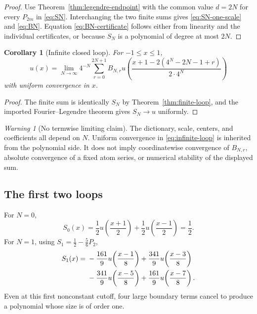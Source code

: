 \documentclass[11pt,oneside]{article}
\newtheorem{corollary}[theorem]{Corollary}
\theoremstyle{definition}
\theoremstyle{remark}
\newtheorem{warning}[theorem]{Warning}
\begin{document}
\begin{proof}
Use Theorem~\ref{thm:legendre-endpoint} with the common value $d=2N$ for
every $P_{2m}$ in \eqref{eq:SN}.  Interchanging the two finite sums gives
\eqref{eq:SN-one-scale} and \eqref{eq:BN}.  Equation
\eqref{eq:BN-certificate} follows either from linearity and the individual
certificates, or because $S_N$ is a polynomial of degree at most $2N$.
\end{proof}

\begin{corollary}[Infinite closed loop]
\label{cor:infinite-loop}
For $-1\le x\le1$,
\begin{equation}
 \boxed{
 u(x)=\lim_{N\to\infty}4^{-N}\sum_{r=0}^{2N+1}B_{N,r}
 u\!\left(
 \frac{x+1-2(4^N-2N-1+r)}{2\cdot4^N}
 \right)}
 \label{eq:infinite-loop}
\end{equation}
with uniform convergence in $x$.
\end{corollary}

\begin{proof}
The finite sum is identically $S_N$ by Theorem~\ref{thm:finite-loop}, and the
imported Fourier--Legendre theorem gives $S_N\to u$ uniformly.
\end{proof}

\begin{warning}[No termwise limiting claim]
The dictionary, scale, centers, and coefficients all depend on $N$.  Uniform
convergence in \eqref{eq:infinite-loop} is inherited from the polynomial side.
It does not imply coordinatewise convergence of $B_{N,r}$, absolute
convergence of a fixed atom series, or numerical stability of the displayed
sum.
\end{warning}

\subsection{The first two loops}
For $N=0$,
\begin{equation}
 S_0(x)=\frac12u\!\left(\frac{x+1}{2}\right)
       +\frac12u\!\left(\frac{x-1}{2}\right)=\frac12.
 \label{eq:S0-loop}
\end{equation}
For $N=1$, using $S_1=\frac12-\frac56P_2$,
\begin{align}
 S_1(x)={}&-\frac{161}{9}u\!\left(\frac{x-1}{8}\right)
 +\frac{341}{9}u\!\left(\frac{x-3}{8}\right)\notag\\
 &-\frac{341}{9}u\!\left(\frac{x-5}{8}\right)
 +\frac{161}{9}u\!\left(\frac{x-7}{8}\right).
 \label{eq:S1-loop}
\end{align}
Even at this first nonconstant cutoff, four large boundary terms cancel to
produce a polynomial whose size is of order one.
\end{document}
